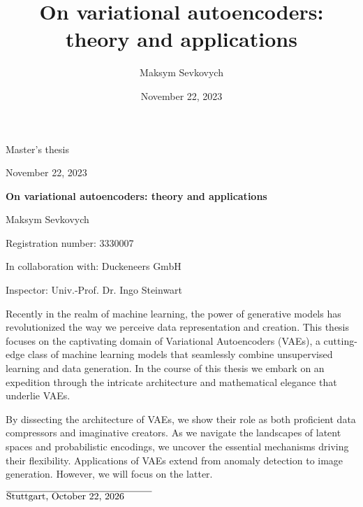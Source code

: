 \documentclass[12pt, a4paper]{scrreprt}
\title{On variational autoencoders: theory and applications}
\date{November 22, 2023}
\author{Maksym Sevkovych}
\theoremstyle{plain}
\theoremstyle{definition}
\theoremstyle{plain}
\begin{document}
\begin{titlepage}
\vspace*{1 cm}
\begin{center}
\LARGE{Master's thesis}

\vspace{0.5 cm}

\large{November 22, 2023}

\vspace{0.5 cm}

\Huge{\textbf{On variational autoencoders: theory and applications}}

\vspace{0.5 cm}

\Large{Maksym Sevkovych}

\Large{Registration number: 3330007}

\Large{In collaboration with: Duckeneers GmbH}
\vspace{1 cm}

\Large{Inspector: Univ.-Prof. Dr. Ingo Steinwart}
\vspace{3cm}
\end{center}
Recently in the realm of machine learning, the power of generative models has revolutionized the way we perceive data representation and creation. This thesis focuses on the captivating domain of Variational Autoencoders (VAEs), a cutting-edge class of machine learning models that seamlessly combine unsupervised learning and data generation. In the course of this thesis we embark on an expedition through the intricate architecture and mathematical elegance that underlie VAEs.

By dissecting the architecture of VAEs, we show their role as both proficient data compressors and imaginative creators. As we navigate the landscapes of latent spaces and probabilistic encodings, we uncover the essential mechanisms driving their flexibility.
Applications of VAEs extend from anomaly detection to image generation. However, we will focus on the latter.
\end{titlepage}
\newpage
\tableofcontents







\vspace{4 cm}

$\overline{\text{Stuttgart, \today} \hspace{1 cm}}$
\end{document}
